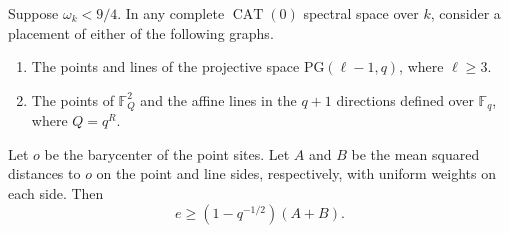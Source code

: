 \begin{lemma}\label{lem:sort-inc}
Suppose $\omega_k<9/4$. In any complete $\operatorname{CAT}(0)$
spectral space over $k$, consider a placement of either of the
following graphs.
\begin{enumerate}
\item The points and lines of the projective space $\mathrm{PG}(\ell-1,q)$,
where $\ell\ge3$.
\item The points of $\mathbb F_Q^2$ and the affine lines in the $q+1$
directions defined over $\mathbb F_q$, where $Q=q^R$.
\end{enumerate}
Let $o$ be the barycenter of the point sites. Let $A$ and $B$ be
the mean squared distances to $o$ on the point and line sides,
respectively, with uniform weights on each side. Then
\[
                 e\ge (1-q^{-1/2})(A+B).
\]
\end{lemma}

